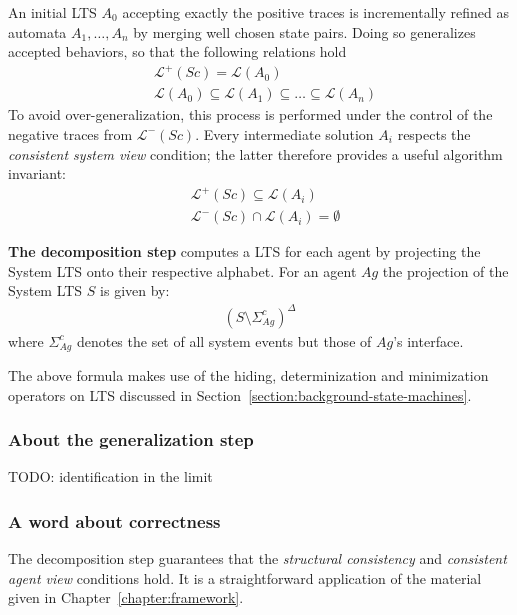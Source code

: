 An initial LTS $A_0$ accepting exactly the positive traces is incrementally refined as automata $A_1,\ldots,A_n$ by merging well chosen state pairs. Doing so generalizes accepted behaviors, so that the following relations hold
\begin{align*}
&\mathcal{L}^+(Sc) = \mathcal{L}(A_0) \\
&\mathcal{L}(A_0) \subseteq \mathcal{L}(A_1) \subseteq \ldots \subseteq \mathcal{L}(A_n)
\end{align*}
To avoid over-generalization, this process is performed under the control of the negative traces from $\mathcal{L}^-(Sc)$. Every intermediate solution $A_i$ respects the \emph{consistent system view} condition; the latter therefore provides a useful algorithm invariant:
\begin{align}
&\mathcal{L}^+(Sc) \subseteq \mathcal{L}(A_i) \\
&\mathcal{L}^-(Sc) \cap \mathcal{L}(A_i) = \emptyset
\label{relation:inductive-invariant}
\end{align}

\noindent \textbf{The decomposition step} computes a LTS for each agent by projecting the System LTS onto their respective alphabet. For an agent $Ag$ the projection of the System LTS $S$ is given by:
\begin{align}
(S \setminus \Sigma_{Ag}^c)^\Delta
\end{align}
\noindent where $\Sigma_{Ag}^c$ denotes the set of all system events but those of $Ag$'s interface.

The above formula makes use of the hiding, determinization and minimization operators on LTS discussed in Section~\ref{section:background-state-machines}.

\subsubsection*{About the generalization step}

TODO: identification in the limit

\subsubsection*{A word about correctness}

The decomposition step guarantees that the \emph{structural consistency} and \emph{consistent agent view} conditions hold. It is a straightforward application of the material given in Chapter~\ref{chapter:framework}. 

